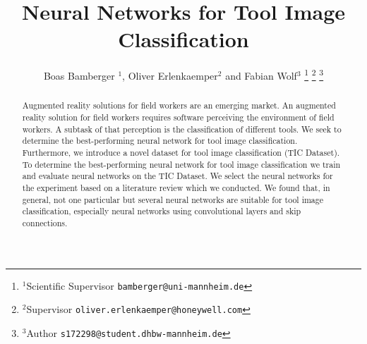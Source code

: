 \documentclass[a4paper, 10pt, journal]{wissarbIEEE}
\title{\LARGE \bf Neural Networks for Tool Image Classification}
\author{Boas Bamberger $^{1}$, Oliver Erlenkaemper$^{2}$ and Fabian Wolf$^{3}$ 
\thanks{$^{1}$Scientific Supervisor {\tt\small bamberger@uni-mannheim.de}} \thanks{$^{2}$Supervisor {\tt\small oliver.erlenkaemper@honeywell.com}} \thanks{$^{3}$Author {\tt\small s172298@student.dhbw-mannheim.de}}
}
\begin{document}
\maketitle
\begin{abstract}
Augmented reality solutions for field workers are an emerging market.\cite{EY.2019a, EY.2019b, Detzel.2018, Shook.2019, Guy.2019} An augmented reality solution for field workers requires software perceiving the environment of field workers. A subtask of that perception is the classification of different tools.
We seek to determine the best-performing neural network for tool image classification.
Furthermore, we introduce a novel dataset for tool image classification (TIC Dataset). To determine the best-performing neural network for tool image classification we train and evaluate neural networks on the TIC Dataset. We select the neural networks for the experiment based on a literature review which we conducted.
We found that, in general, not one particular but several neural networks are suitable for tool image classification, especially neural networks using convolutional layers and skip connections.
\end{abstract}
\end{document}
